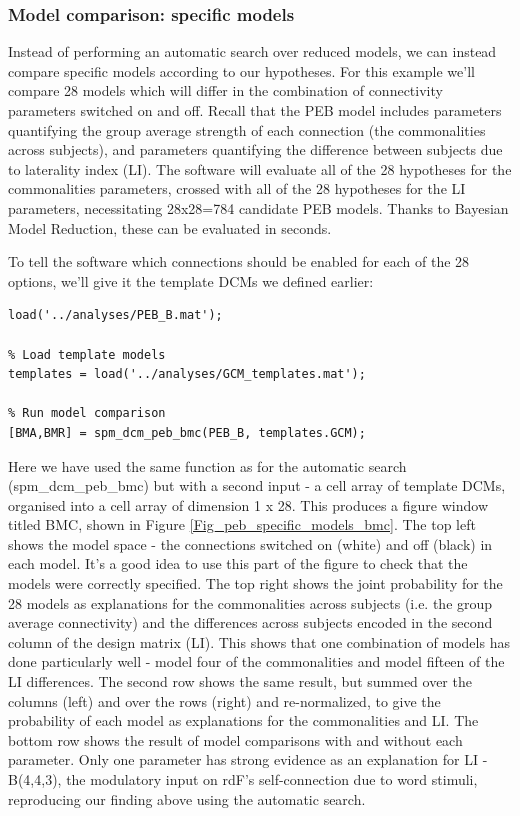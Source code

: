 \documentclass{article}
\begin{document}
\subsubsection{Model comparison: specific models}
Instead of performing an automatic search over reduced models, we can instead compare specific models according to our hypotheses. For this example we'll compare 28 models which will differ in the combination of connectivity parameters switched on and off. Recall that the PEB model includes parameters quantifying the group average strength of each connection (the commonalities across subjects), and parameters quantifying the difference between subjects due to laterality index (LI). The software will evaluate all of the 28 hypotheses for the commonalities parameters, crossed with all of the 28 hypotheses for the LI parameters, necessitating 28x28=784 candidate PEB models. Thanks to Bayesian Model Reduction, these can be evaluated in seconds.

To tell the software which connections should be enabled for each of the 28 options, we'll give it the template DCMs we defined earlier:

\begin{lstlisting}[style=Matlab-editor,caption=Compare specific PEB models]
% Load estimated PEB
load('../analyses/PEB_B.mat');

% Load template models
templates = load('../analyses/GCM_templates.mat');

% Run model comparison
[BMA,BMR] = spm_dcm_peb_bmc(PEB_B, templates.GCM);
\end{lstlisting}

Here we have used the same function as for the automatic search (spm\_dcm\_peb\_bmc) but with a second input - a cell array of template DCMs, organised into a cell array of dimension 1 x 28. This produces a figure window titled BMC, shown in Figure \ref{Fig_peb_specific_models_bmc}. The top left shows the model space - the connections switched on (white) and off (black) in each model. It's a good idea to use this part of the figure to check that the models were correctly specified. The top right shows the joint probability for the 28 models as explanations for the commonalities across subjects (i.e. the group average connectivity) and the differences across subjects encoded in the second column of the design matrix (LI). This shows that one combination of models has done particularly well - model four of the commonalities and model fifteen of the LI differences. The second row shows the same result, but summed over the columns (left) and over the rows (right) and re-normalized, to give the probability of each model as explanations for the commonalities and LI. The bottom row shows the result of model comparisons with and without each parameter. Only one parameter has strong evidence as an explanation for LI - B(4,4,3), the modulatory input on rdF's self-connection due to word stimuli, reproducing our finding above using the automatic search.
\end{document}
